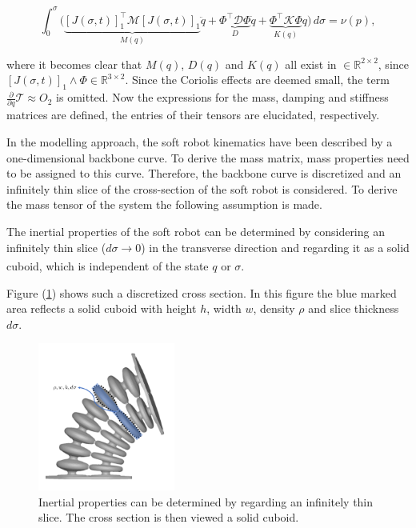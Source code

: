 \begin{equation}
    \int_0^\sigma \Big( \underbrace{[J(\sigma,t)]_1^\top \mathcal{M} [J(\sigma,t)]_1}_{M(q)} \ddot{q} +  \underbrace{\Phi^\top \mathcal{D} \Phi }_{D} \dot{q}    +   \underbrace{\Phi^\top \mathcal{K} \Phi}_{K(q)} q\Big) \hspace{2pt} d\sigma = \nu(p),
\end{equation}

where it becomes clear that $M(q)$, $D(q)$ and $K(q)$ all exist in $\in \mathbb{R}^{2\times2}$, since $[J(\sigma,t)]_1 \land \Phi \in \mathbb{R}^{3 \times 2}$. Since the Coriolis effects are deemed small, the term $\frac{\partial}{\partial q}\mathcal{T} \approx O_2 $ is omitted. Now the expressions for the mass, damping and stiffness matrices are defined, the entries of their tensors are elucidated, respectively.

In the modelling approach, the soft robot kinematics have been described by a one-dimensional backbone curve. To derive the mass matrix, mass properties need to be assigned to this curve. Therefore, the backbone curve is discretized and an infinitely thin slice of the cross-section of the soft robot is considered. To derive the mass tensor of the system the following assumption is made.

\begin{theorem}
The inertial properties of the soft robot can be determined by considering an infinitely thin slice ($d \sigma \xrightarrow[]{}0$) in the transverse direction and regarding it as a solid cuboid, which is independent of the state $q$ or $\sigma$.
\end{theorem}

Figure (\ref{fig:massapprox}) shows such a discretized cross section. In this figure the blue marked area reflects a solid cuboid with height $h$, width $w$, density $\rho$ and slice thickness $d\sigma$. 


\begin{figure}[H]
    \centering
    \includegraphics[width = 0.4\textwidth]{Figures/Chapter2/massapprox.png}
    \caption{Inertial properties can be determined by regarding an infinitely thin slice. The cross section is then viewed a solid cuboid.}
    \label{fig:massapprox}
\end{figure}


